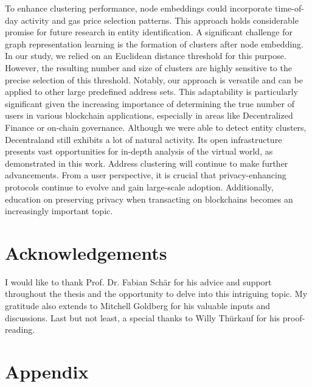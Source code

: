 \documentclass[12pt,a4paper,titlepage,oneside,english]{article}
\begin{document}
To enhance clustering performance, node embeddings could incorporate time-of-day activity and gas price selection patterns. This approach holds considerable promise for future research in entity identification. \newline
A significant challenge for graph representation learning is the formation of clusters after node embedding. In our study, we relied on an Euclidean distance threshold for this purpose. However, the resulting number and size of clusters are highly sensitive to the precise selection of this threshold. \newline
Notably, our approach is versatile and can be applied to other large predefined address sets. This adaptability is particularly significant given the increasing importance of determining the true number of users in various blockchain applications, especially in areas like Decentralized Finance or on-chain governance. \newline
Although we were able to detect entity clusters, Decentraland still exhibits a lot of natural activity. Its open infrastructure presents vast opportunities for in-depth analysis of the virtual world, as demonstrated in this work. \newline
Address clustering will continue to make further advancements. From a user perspective, it is crucial that privacy-enhancing protocols continue to evolve and gain large-scale adoption. Additionally, education on preserving privacy when transacting on blockchains becomes an increasingly important topic.

\newpage
\section*{Acknowledgements}
I would like to thank Prof. Dr. Fabian Schär for his advice and support throughout the thesis and the opportunity to delve into this intriguing topic. My gratitude also extends to Mitchell Goldberg for his valuable inputs and discussions. Last but not least, a special thanks to Willy Thürkauf for his proof-reading.


\newpage
\setcounter{page}{1}
\onehalfspacing
{}



\section{Appendix}
\end{document}
